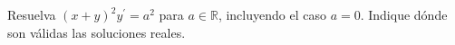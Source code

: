 Resuelva $(x+y)^2y^{\prime}=a^2$ para $a\in\mathbb R$, incluyendo el caso $a=0$. Indique dónde son válidas las soluciones reales.
